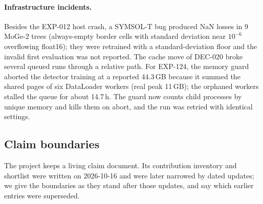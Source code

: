 \paragraph{Infrastructure incidents.}
Besides the EXP-012 host crash, a SYMSOL-T bug produced NaN losses in 9 MoGe-2 trees (always-empty border cells with standard deviation near $10^{-6}$ overflowing float16); they were retrained with a standard-deviation floor and the invalid first evaluation was not reported. The cache move of DEC-020 broke several queued runs through a relative path. For EXP-124, the memory guard aborted the detector training at a reported 44.3\,GB because it summed the shared pages of six DataLoader workers (real peak 11\,GB); the orphaned workers stalled the queue for about 14.7\,h. The guard now counts child processes by unique memory and kills them on abort, and the run was retried with identical settings.

\subsection{Claim boundaries}\label{app:log_claims}

The project keeps a living claim document. Its contribution inventory and shortlist were written on 2026-10-16 and were later narrowed by dated updates; we give the boundaries as they stand after those updates, and say which earlier entries were superseded.

